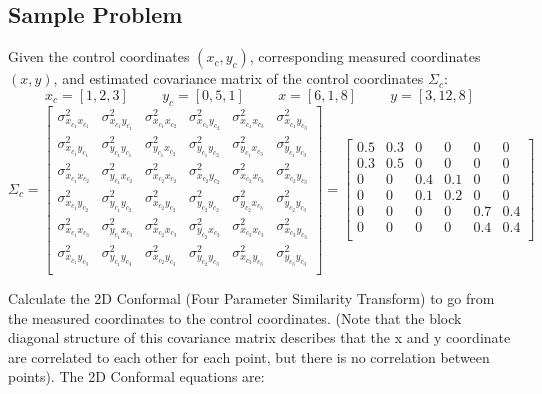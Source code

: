 \subsection{Sample Problem}
Given the control coordinates $(x_c,y_c)$, corresponding measured coordinates $(x,y)$, and estimated covariance matrix of the control coordinates $\Sigma_c$: 
\[
x_c = [1,2,3] \hspace{1cm} y_c = [0, 5, 1]  \hspace{1cm} x = [6,1,8] \hspace{1cm} y = [3,12,8]
\]
\[
\Sigma_c = 
 \begin{bmatrix}
\sigma_{x_{c_1}x_{c_1}}^2 & \sigma_{x_{c_1}y_{c_1}}^2 & \sigma_{x_{c_1}x_{c_2}}^2 & \sigma_{x_{c_1}y_{c_2}}^2 & \sigma_{x_{c_1}x_{c_3}}^2 & \sigma_{x_{c_1}y_{c_3}}^2  \\ 
\sigma_{x_{c_1}y_{c_1}}^2 & \sigma_{y_{c_1}y_{c_1}}^2 & \sigma_{y_{c_1}x_{c_2}}^2 & \sigma_{y_{c_1}y_{c_2}}^2 & \sigma_{y_{c_1}x_{c_3}}^2 & \sigma_{y_{c_1}y_{c_3}}^2  \\ 
\sigma_{x_{c_1}x_{c_2}}^2 & \sigma_{y_{c_1}x_{c_2}}^2 & \sigma_{x_{c_2}x_{c_2}}^2 & \sigma_{x_{c_2}y_{c_2}}^2 & \sigma_{x_{c_2}x_{c_3}}^2 & \sigma_{x_{c_2}y_{c_3}}^2  \\ 
\sigma_{x_{c_1}y_{c_2}}^2 & \sigma_{y_{c_1}y_{c_2}}^2 & \sigma_{x_{c_2}y_{c_2}}^2 & \sigma_{y_{c_2}y_{c_2}}^2 & \sigma_{y_{c_2}x_{c_3}}^2 & \sigma_{y_{c_2}y_{c_3}}^2  \\ 
\sigma_{x_{c_1}x_{c_3}}^2 & \sigma_{y_{c_1}x_{c_3}}^2 & \sigma_{x_{c_2}x_{c_3}}^2 & \sigma_{y_{c_2}x_{c_3}}^2 & \sigma_{x_{c_3}x_{c_3}}^2 & \sigma_{x_{c_3}y_{c_3}}^2  \\ 
\sigma_{x_{c_1}y_{c_3}}^2 & \sigma_{y_{c_1}y_{c_3}}^2 & \sigma_{x_{c_2}y_{c_3}}^2 & \sigma_{y_{c_2}y_{c_3}}^2 & \sigma_{x_{c_3}y_{c_3}}^2 & \sigma_{y_{c_3}y_{c_3}}^2  \\ 
 \end{bmatrix}
 = 
 \begin{bmatrix}
 0.5 & 0.3 & 0 & 0 & 0 & 0 \\
 0.3 & 0.5 & 0 & 0 & 0 & 0 \\
 0 & 0 & 0.4 & 0.1 & 0 & 0 \\
 0 & 0 & 0.1 & 0.2 & 0 & 0 \\
 0 & 0 & 0 & 0 & 0.7 & 0.4 \\
 0 & 0 & 0 & 0 & 0.4 & 0.4 \\
 \end{bmatrix} 
\]

Calculate the 2D Conformal (Four Parameter Similarity Transform) to go from the measured coordinates to the control coordinates.  (Note that the block diagonal structure of this covariance matrix describes that the x and y coordinate are correlated to each other for each point, but there is no correlation between points).  The 2D Conformal equations are:


